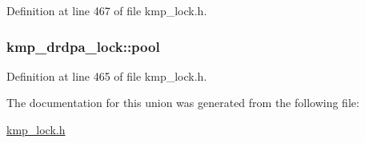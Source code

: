 Definition at line 467 of file kmp\-\_\-lock.\-h.

\hypertarget{unionkmp__drdpa__lock_aa1495910d6f872d35d4b7dd3dcbd5c8b}{
\subsubsection[{pool}]{ kmp\-\_\-drdpa\-\_\-lock\-::pool}}\label{unionkmp__drdpa__lock_aa1495910d6f872d35d4b7dd3dcbd5c8b}


Definition at line 465 of file kmp\-\_\-lock.\-h.



The documentation for this union was generated from the following file\-:\begin{DoxyCompactItemize}
\item 
\hyperlink{kmp__lock_8h}{kmp\-\_\-lock.\-h}\end{DoxyCompactItemize}
